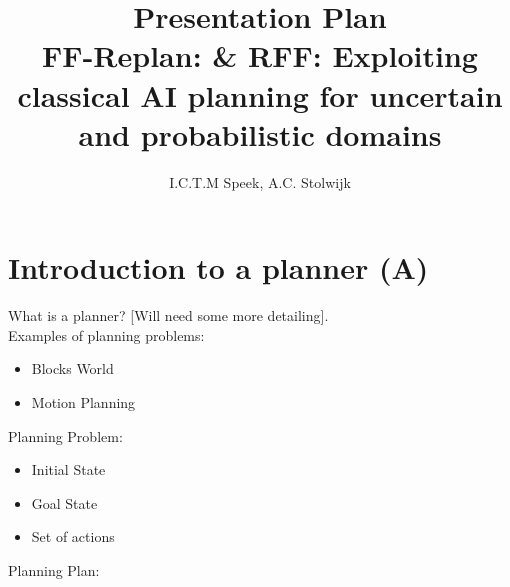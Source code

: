 \documentclass[runningheads,a4paper]{llncs}
\begin{document}
\mainmatter%

\title{Presentation Plan\\
FF-Replan: \& RFF\@: Exploiting classical AI planning for uncertain and probabilistic domains}


\author{I.C.T.M Speek, A.C. Stolwijk}

%



\maketitle

\section{Introduction to a planner (A)}

What is a planner? [Will need some more detailing].\\

Examples of planning problems:

\begin{itemize}
	\item Blocks World
	\item Motion Planning
\end{itemize}

Planning Problem:

\begin{itemize}
	\item Initial State
	\item Goal State
	\item Set of actions
\end{itemize}

Planning Plan:
\end{document}
